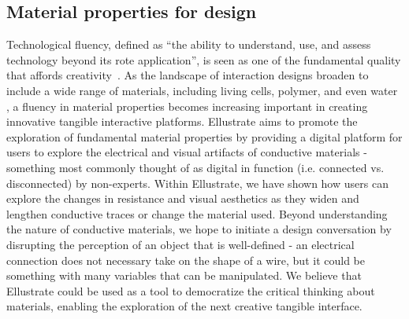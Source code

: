 \documentclass{sigchi}
\begin{document}
\subsection{Material properties for design}
Technological fluency, defined as ``the ability to understand, use, and assess technology beyond its rote application'', is seen as one of the fundamental quality that affords creativity~\cite{Lukens:2011jl}. As the landscape of interaction designs broaden to include a wide range of materials, including living cells, polymer, and even water~\cite{Yao:2015gw,Lo:2014vw,Nakagaki:2016kf} , a fluency in material properties becomes increasing important in creating innovative tangible interactive platforms. Ellustrate aims to promote the exploration of fundamental material properties by providing a digital platform for users to explore the electrical and visual artifacts of conductive materials - something most commonly thought of as digital in function (i.e. connected vs. disconnected) by non-experts. Within Ellustrate, we have shown how users can explore the changes in resistance and visual aesthetics as they widen and lengthen conductive traces or change the material used. Beyond understanding the nature of conductive materials, we hope to initiate a design conversation by disrupting the perception of an object that is well-defined - an electrical connection does not necessary take on the shape of a wire, but it could be something with many variables that can be manipulated. We believe that Ellustrate could be used as a tool to democratize the critical thinking about materials, enabling the exploration of the next creative tangible interface. 


\end{document}
